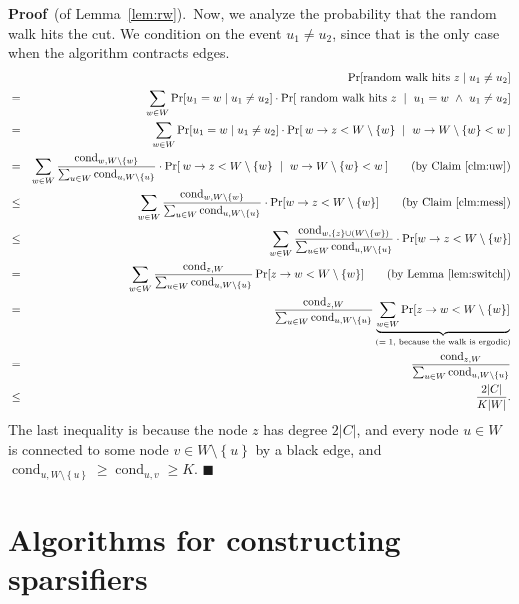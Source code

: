 \documentclass[11pt]{article}
\newcommand{\proofbelow}{8pt}
\numberwithin{equation}{section}
\newenvironment{proofof}[1]{\noindent\textbf{Proof} \,(of #1).\,}{\afterproof}
\newcommand{\afterproof}{\hfill $\blacksquare$ \par \vspace{\proofbelow}}
\newcommand{\union}{\cup}
\newcommand{\cond}{\operatorname{cond}}
\newcommand{\set}[1]{\left \{ #1 \right \}}                     \newcommand{\setst}[2]{\left\{\; #1 \,:\, #2 \;\right\}}
\newcommand{\AppendixName}[1]{\label{app:#1}}
\newcommand{\Claim}[1]{Claim~\ref{clm:#1}}
\newcommand{\Lemma}[1]{Lemma~\ref{lem:#1}}
\begin{document}
\begin{proofof}{\Lemma{rw}}
Now, we analyze the probability that the random walk hits the cut.
We condition on the event $u_1 \neq u_2$, since that is the only case when
the algorithm contracts edges.
\begin{eqnarray*}
&&\Pr[\text{random walk hits } z \mid u_1 \neq u_2] \\
&=& 
\sum_{w\in W} \Pr[u_1=w \mid u_1 \neq u_2]
    \cdot \Pr[ \text{ random walk hits } z ~\mid~ u_1=w ~\wedge~ u_1 \neq u_2] \\
&=& 
\sum_{w\in W} \Pr[u_1=w \mid u_1 \neq u_2]
    \cdot \Pr[\: w \rightarrow z < W \setminus \{w\} ~\mid~ w \rightarrow W \setminus \set{w} < w \:] \\
&=& 
\sum_{w\in W} \frac{ \cond_{w,W \setminus \set{w}} }
                   { \sum_{u \in W} \cond_{u,W \setminus \set{u}} }
    \cdot \Pr[\: w \rightarrow z < W \setminus \set{w} ~\mid~ w \rightarrow W \setminus \set{w} < w \:]
    \qquad\text{(by \Claim{uw})} \\
&\leq& 
\sum_{w\in W} \frac{ \cond_{w,W\setminus \set{w}} }
                   { \sum_{u \in W} \cond_{u,W \setminus \set{u}} }
    \cdot \Pr[ w \rightarrow z < W \setminus \set{w} ]
    \qquad\text{(by \Claim{mess})} \\
&\leq& 
\sum_{w\in W} \frac{ \cond_{w,\set{z} \union (W \setminus \set{w})} }
                   { \sum_{u \in W} \cond_{u,W\setminus \set{u}} }
    \cdot \Pr[ w \rightarrow z < W \setminus \set{w} ] \\
&=& \sum_{w\in W} 
\frac{ \cond_{z,W} }
{ \sum_{u\in W} \cond_{u,W\setminus \set{u}} }
\Pr[ z \rightarrow w < W \setminus \set{w} ]
    \qquad\text{(by Lemma~\ref{lem:switch})}\\
&=&  
\frac{ \cond_{z,W} }
{ \sum_{u\in W} \cond_{u,W\setminus \set{u}} }
\underbrace{\sum_{w\in W} \Pr[ z \rightarrow w < W \setminus \set{w} ]}_{
    \text{($=1$, because the walk is ergodic)} } \\
&=&  
\frac{ \cond_{z,W} }
{ \sum_{u\in W} \cond_{u,W\setminus \set{u}} } \\
&\le& \frac{2|C|}{K |W|}.
\end{eqnarray*}
The last inequality is because the node $z$ has degree $2 |C|$,
and every node $u \in W$ is connected to some node $v \in W \setminus \set{u}$
by a black edge, and $\cond_{u,W \setminus \set{u}} \geq \cond_{u,v} \geq K$.
\end{proofof}




\section{Algorithms for constructing sparsifiers}
\AppendixName{SketchAlgorithms}
\end{document}
